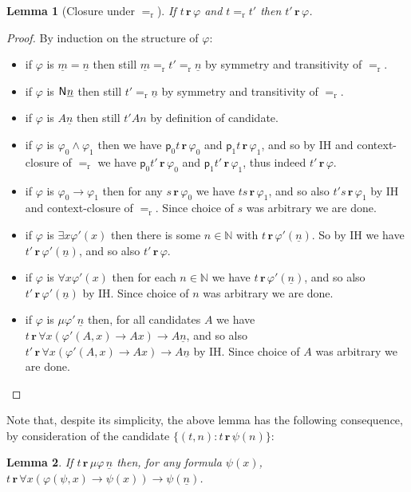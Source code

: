 \documentclass[10pt,a4paper]{amsart}
\theoremstyle{plain}
\newtheorem{lemma}[lemma]{Lemma}
\theoremstyle{definition}
\renewcommand{\phi}{\varphi}
\theoremstyle{plain}
\theoremstyle{definition} %
\newcommand{\numeral}[1]{\underline{#1}}
\newcommand{\Nat}{\mathbb{N}}
\newcommand{\proj}[1]{\mathsf{p}_{#1}}
\newcommand{\projl}{\proj 0}
\newcommand{\projr}{\proj 1}
\newcommand{\reduction}{\mathrm{r}}
\newcommand{\converts}{=_{\reduction}}
\renewcommand{\land}{\wedge}
\newcommand{\limp}{\to}
\newcommand{\realises}{\mathbf{r}}
\newcommand{\pNat}{\mathsf{N}}
\newcommand{\pnat}[1]{\pNat\hspace{.05em} #1 }
\begin{document}
\begin{lemma}
    [Closure under $\converts$]
    \label{lem:realises-closed-under-converts}
    If $t \, \realises\, \phi$ and $t\converts t'$ then $t'\, \realises \, \phi$.
\end{lemma}
\begin{proof}
    By induction on the structure of $\phi$:
    \begin{itemize}
        \item if $\phi$ is $\numeral m=\numeral n$ then still $\numeral m \converts t' \converts \numeral n$ by symmetry and transitivity of $\converts$.
        \item if $\phi$ is $\pnat {\numeral n}$ then still $t' \converts \numeral n$ by symmetry and transitivity of $\converts$.
        \item if $\phi$ is $A\numeral n $ then still $t' A n$ by definition of candidate.
         \item if $\phi$ is $\phi_0 \land \phi_1$ then we have $\projl t \, \realises\, \phi_0$ and $\projr t\, \realises\, \phi_1$, and so by IH and context-closure of $\converts$ we have $\projl t' \, \realises\, \phi_0$ and $\projr t'\, \realises\, \phi_1$, thus indeed $t'\, \realises\, \phi$.
        \item if $\phi$ is $\phi_0 \limp \phi_1$ then for any $s\, \realises\, \phi_0$ we have $ts \, \realises \, \phi_1$, and so also $t's \, \realises \, \phi_1$ by IH and context-closure of $\converts$. 
        Since choice of $s$ was arbitrary we are done.
        \item if $\phi $ is $\exists x\phi'(x)$ then there is some $n\in \Nat $ with $ t \, \realises\, \phi'(\numeral n)$. 
        So by IH we have $ t' \, \realises\, \phi'(\numeral n)$, and so also $t'\, \realises\, \phi $.
        \item if $\phi$ is $\forall x \phi'(x)$ then for each $n\in \Nat$ we have $t\, \realises\, \phi'(\numeral n)$, and so also $t' \, \realises\, \phi'(\numeral n)$ by IH. Since choice of $n$ was arbitrary we are done.
        \item if $\phi$ is $\mu\phi'\, \numeral n$ then, for all candidates $A$ we have $t \, \realises \, \forall x (\phi'(A,x) \limp Ax) \limp A\numeral n$, and so also $t' \, \realises \, \forall x (\phi'(A,x) \limp Ax) \limp A\numeral n$ by IH.
        Since choice of $A$ was arbitrary we are done. \qedhere
    \end{itemize}
\end{proof}

Note that, despite its simplicity, the above lemma has the following consequence, by consideration of the candidate $\{(t,n) : t \, \realises\, \psi(n)\}$:
\begin{lemma}
\label{prop:mu-realiser-realises-formula-invariants}
    If $t \, \realises\, \mu \phi\, \numeral n$ then, for any formula $\psi(x)$, $t \, \realises\, \forall x (\phi(\psi,x) \limp \psi(x)) \limp \psi(\numeral n)$.
\end{lemma}
\end{document}
